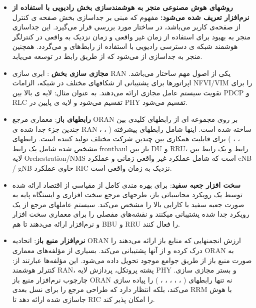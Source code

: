 \begin{itemize}
\item \textbf{روشهای هوش مصنوعی 
  منجر به هوشمندسازی بخش رادیویی با استفاده از نرم‌افزار تعریف شده  
  می‌شود:}
   مفهوم 
  که مبنی بر جداسازی 
   بخش صفحه ی کنترل  از
   صفحه‌ی کاربر 
می‌باشد، در ساختار 
مورد بررسی قرار می‌گیرد.
این جداسازی منجر به بهبود 
برای استفاده از زمان غیر واقعی و زمان نزدیک به واقعی در کنترلگر هوشمند شبکه ی دسترسی رادیویی   
با استفاده از رابط‌های 
و
 می‌‌گردد.
همچنین 
منجر به جداسازی 
 از 
 می‌شود
 که از طریق رابط  در  توسعه می‌یابد.
\item \textbf{مجازی سازی بخش }:
 ابری سازی RAN یکی از اصول مهم ساختار 
  می‌باشد.
 اپراتورها برای پشتیبانی از شکافهای مختلف در شبکه، الزامات NFVI/VIM را برای تقویت سیستم عامل مجازی ارائه می‌دهند.
 به عنوان مثال: لایه ی بالا بین PDCP و RLC تقسیم می‌شود و لایه ی پایین در PHY تقسیم می‌شود.
\item \textbf{رابطهای باز}:
معماری مرجع ORAN بر روی مجموعه ای از رابطهای کلیدی بین چندین جزء جدا شده ی RAN ساخته شده است.
اینها شامل رابطهای  پیشرفته 
(
،
،
،
،
)
 برای قابلیت همکاری بین چندین شرکت مختلف تولید کننده است.
رابطهای مشخص شده  شامل یک رابط fronthaul باز بین DU و RRU، رابط  و یک رابط  بین لایه 
Orchestration/NMS 
است که شامل عملکرد
 غیر واقعی زمانی  و عملکرد eNB / gNB حاوی عملکرد RIC نزدیک به زمان واقعی 
است.
\item \textbf{سخت افزار جعبه سفید}:
برای بهره مندی کامل از مقیاسی از اقتصاد ارائه شده توسط یک رویکرد  محاسباتی باز،  
طرحهای مرجع 
سخت افزاری و ایستگاه پایه به صورت جعبه سفید با کارایی بالا را مشخص می‌کند. 
سیستم عاملهای مرجع از یک رویکرد جدا شده پشتیبانی میکنند و نقشه‌های مفصلی را برای معماری سخت افزار و نرم‌افزار ارائه می‌دهند تا هم BBU و RRU را فعال کنند. 
\item \textbf{نرم‌افزار منبع باز}:
اتحادیه ORAN ارزش انجمنهایی که منابع باز ارا‌ئه می‌دهند را درک کرده   
 و از آنها پشتیبانی می‌کند.
 بسیاری از مؤلفه‌های معماری ORAN به صورت منبع باز از طریق جوامع موجود تحویل داده می‌شود.
 این مؤلفه‌ها عبارتند از: کنترلر هوشمند RAN، پشته پروتکل، پردازش لایه PHY و بستر مجازی سازی.
  چارچوب نرم‌افزار منبع باز ORAN نه تنها رابطهای 
(
،
،
،
،
،
)
  را پیاده سازی می‌کند، بلکه انتظار دارد که طراحی مرجع را برای نسل بعدی RRM با هوش جاسازی شده ارائه دهد تا RIC را امکان پذیر کند.
\end{itemize}

